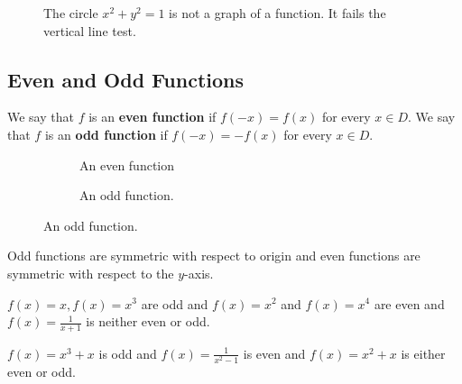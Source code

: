 \documentclass[../calc1-main.tex]{subfiles}
\begin{document}
\begin{figure}[H]
  \centering
  
  \caption{The circle $x^2+y^2=1$ is not a graph of a function. It fails the vertical line test.}
\end{figure}

\subsection*{Even and Odd Functions}

\begin{definition}
  We say that $f$ is an \textbf{even function} if $f\left( -x\right) =f\left( x\right) $ for every $x\in D$.
  We say that $f$ is an \textbf{odd function} if $f(-x)=-f(x)$ for every $x\in D$.
\end{definition}

\begin{figure}[H]
  \centering
  \begin{subfigure}{0.3\textwidth}
    
    \caption{An even function}
  \end{subfigure}
  \begin{subfigure}{0.3\textwidth}
    
    \caption{An odd function.}
  \end{subfigure}
\end{figure}

Odd functions are symmetric with respect to origin and even functions are symmetric with respect to the $y$-axis.


\begin{example}
  $f(x)=x,f(x)=x^{3}$ are odd and $f(x)=x^{2}$ and $f(x) =x^{4}$ are even and $f(x)=\frac{1}{x+1}$ is neither even or odd.
\end{example}

\begin{example}
  $f(x)=x^{3}+x$ is odd and $f(x)=\frac{1}{x^{2}-1}$ is even and $f(x)=x^{2}+x$
  is either even or odd.
\end{example}
\end{document}
